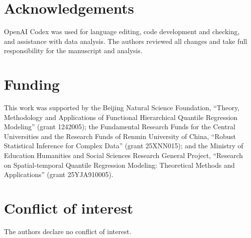 \documentclass[namedate,webpdf,modern,mediumone]{oup-authoring-template}
\begin{document}
\section*{Acknowledgements}

OpenAI Codex was used for language editing, code development and checking,
and assistance with data analysis. The authors
reviewed all changes and take full responsibility for the manuscript and
analysis.

\section*{Funding}

This work was supported by the Beijing Natural Science Foundation, ``Theory,
Methodology and Applications of Functional Hierarchical Quantile Regression
Modeling'' (grant 1242005); the Fundamental Research Funds for the Central
Universities and the Research Funds of Renmin University of China, ``Robust
Statistical Inference for Complex Data'' (grant 25XNN015); and the Ministry of
Education Humanities and Social Sciences Research General Project, ``Research
on Spatial-temporal Quantile Regression Modeling: Theoretical Methods and
Applications'' (grant 25YJA910005).

\section*{Conflict of interest}

The authors declare no conflict of interest.
\end{document}
